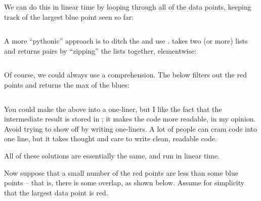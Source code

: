 \begin{progprob}
\begin{subprobset}
\begin{subprob}
\begin{soln}
                We can do this in linear time by looping through all of the
                data points, keeping track of the largest blue point seen
                so far:

                \inputminted{python}{\thisdir/include-solution/pp01a-enum.py}

                A more ``pythonic'' approach is to ditch the 
                and use .  takes two (or more) lists
                and returns pairs by ``zipping'' the lists together, elementwise:

                \inputminted{python}{\thisdir/include-solution/pp01a.py}

                Of course, we could always use a comprehension. The below
                filters out the red points and returns the max of the blues:

                \inputminted{python}{\thisdir/include-solution/pp01a-max.py}

                You could make the above into a one-liner, but I like the
                fact that the intermediate result is stored in ;
                it makes the code more readable, in my opinion. Avoid trying to show
                off by writing one-liners. A lot of people can cram code into
                one line, but it takes thought and care to write clean, readable code.

                All of these solutions are essentially the same, and run in
                linear time.
            \end{soln}

        \end{subprob}
    \end{subprobset}

        Now suppose that a small number of the red points are less
        than some blue points -- that is, there is some overlap, as shown
        below. Assume for simplicity that the largest data point is red.

        \begin{center}
\end{center}
\end{progprob}
